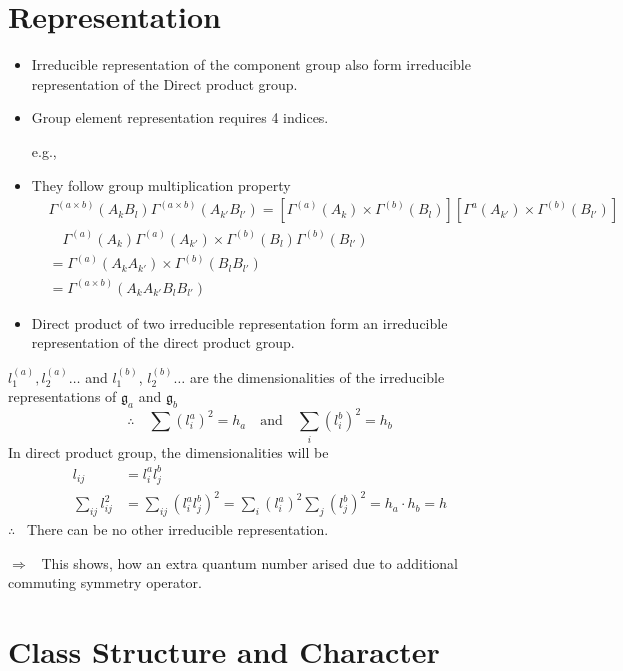 \section*{Representation}
\begin{itemize}
\item Irreducible representation of the component group also form irreducible representation of the Direct product group.

\item Group element representation requires 4 indices.

e.g., 

\item They follow group multiplication property
\begin{align*}
& \Gamma^{(a\times b)}(A_{k}B_{l})\Gamma^{(a\times b)}(A_{k'}B_{l'})=\left[\Gamma^{(a)}(A_{k})\times \Gamma^{(b)}(B_{l})\right]\left[\Gamma^{a}(A_{k'})\times \Gamma^{(b)}(B_{l'})\right]\\
&\quad \Gamma^{(a)}(A_{k})\Gamma^{(a)}(A_{k'})\times \Gamma^{(b)}(B_{l})\Gamma^{(b)}(B_{l'})\\
&= \Gamma^{(a)}(A_{k}A_{k'})\times \Gamma^{(b)}(B_{l}B_{l'})\\
&= \Gamma^{(a\times b)}(A_{k}A_{k'}B_{l}B_{l'})
\end{align*}

\item Direct product of two irreducible representation form an irreducible representation of the direct product group.
\end{itemize}
$l^{(a)}_{1},l^{(a)}_{2}\ldots $ and $l^{(b)}_{1}$, $l^{(b)}_{2}\ldots$ are the dimensionalities of the irreducible representations of $\mathfrak{g}_{a}$ and $\mathfrak{g}_{b}$
$$
\therefore\quad \sum (l^{a}_{i})^{2}=h_{a}\quad\text{and}\quad \sum\limits_{i}(l^{b}_{i})^{2}=h_{b}
$$
In direct product group, the dimensionalities will be 
\begin{align*}
l_{ij} &= l^{a}_{i}l^{b}_{j}\\
\sum\limits_{ij}l^{2}_{ij} &= \sum\limits_{ij}(l^{a}_{i}l^{b}_{j})^{2}=\sum\limits_{i}(l^{a}_{i})^{2}\sum\limits_{j}(l^{b}_{j})^{2}=h_{a}\cdot h_{b}=h
\end{align*}
$\therefore$ \ There can be no other irreducible representation.

$\Rightarrow$ \ This shows, how an extra quantum number arised due to additional commuting symmetry operator.

\section*{Class Structure and Character}

